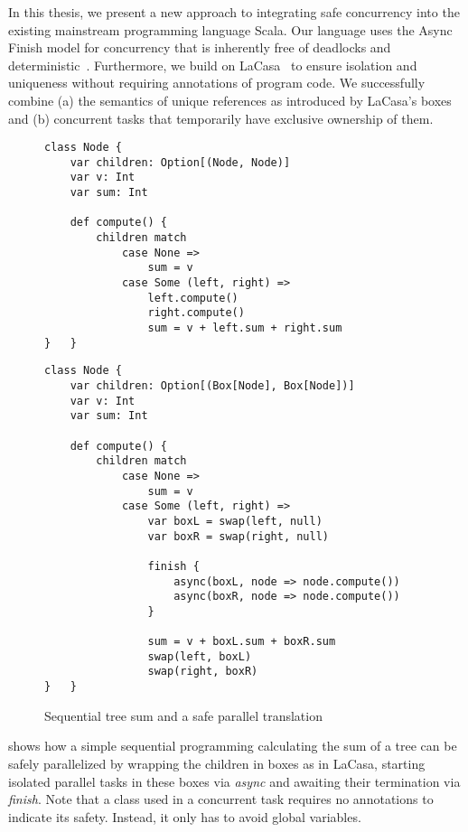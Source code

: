 In this thesis, we present a new approach to integrating safe concurrency into the existing mainstream programming language Scala. Our language uses the Async Finish model for concurrency that is inherently free of deadlocks and deterministic~\cite{charles_x10_2005}. Furthermore, we build on LaCasa~\cite{haller_lacasa_2016} to ensure isolation and uniqueness without requiring annotations of program code. We successfully combine (a) the semantics of unique references as introduced by LaCasa's boxes and (b) concurrent tasks that temporarily have exclusive ownership of them.

\begin{figure}
\begin{lstlisting}
class Node {
	var children: Option[(Node, Node)]
	var v: Int
	var sum: Int

	def compute() {
		children match
			case None =>
				sum = v
			case Some (left, right) =>
				left.compute()
				right.compute()
				sum = v + left.sum + right.sum
}	}
\end{lstlisting}
\begin{lstlisting}
class Node {
	var children: Option[(Box[Node], Box[Node])]
	var v: Int
	var sum: Int

	def compute() {
 		children match
			case None =>
				sum = v
			case Some (left, right) =>
				var boxL = swap(left, null)
				var boxR = swap(right, null)

				finish {
					async(boxL, node => node.compute())
					async(boxR, node => node.compute())
				}

				sum = v + boxL.sum + boxR.sum
				swap(left, boxL)
				swap(right, boxR)
}	}
\end{lstlisting}
    \caption{Sequential tree sum and a safe parallel translation}
    \label{fig:example-before-after}
\end{figure}

 shows how a simple sequential programming calculating the sum of a tree can be safely parallelized by wrapping the children in boxes as in LaCasa, starting isolated parallel tasks in these boxes via \textit{async} and awaiting their termination via \textit{finish}. Note that a class used in a concurrent task requires no annotations to indicate its safety. Instead, it only has to avoid global variables.

